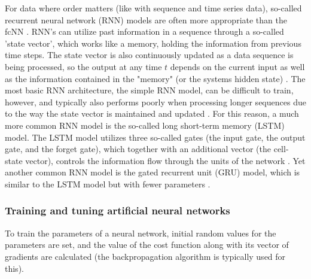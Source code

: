 For data where order matters (like with sequence and time series data), so-called recurrent neural network (RNN) models are often more appropriate than the fcNN \cite{LeCun2015}. RNN's can utilize past information in a sequence through a so-called 'state vector', which works like a memory, holding the information from previous time steps. The state vector is also continuously updated as a data sequence is being processed, so the output at any time $t$ depends on the current input as well as the information contained in the "memory" (or the systems hidden state) \cite{LeCun2015}. The most basic RNN architecture, the simple RNN model, can be difficult to train, however, and typically also performs poorly when processing longer sequences due to the way the state vector is maintained and updated \cite{LeCun2015}. For this reason, a much more common RNN model is the so-called long short-term memory (LSTM) model. The LSTM model utilizes three so-called gates (the input gate, the output gate, and the forget gate), which together with an additional vector (the cell-state vector), controls the information flow through the units of the network \cite{LeCun2015}. Yet another common RNN model is the gated recurrent unit (GRU) model, which is similar to the LSTM model but with fewer parameters \cite{Chollet2017}. 

\subsubsection{Training and tuning artificial neural networks}
To train the parameters of a neural network, initial random values for the parameters are set, and the value of the cost function along with its vector of gradients are calculated (the backpropagation algorithm is typically used for this). 






